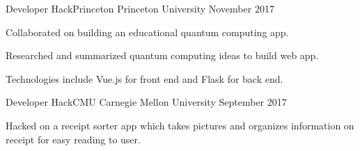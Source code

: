 \begin{cventries}
    \cventry
      {Developer}
      {HackPrinceton}
      {Princeton University}
      {November 2017}
      {
        \begin{cvitems}
            \item Collaborated on building an educational quantum computing app. 
            \item Researched and summarized quantum computing ideas to build web app.
            \item Technologies include Vue.js for front end and Flask for back end.
        \end{cvitems}
    }
    
    \cventry
      {Developer}
      {HackCMU}
      {Carnegie Mellon University}
      {September 2017}
      {
        \begin{cvitems}
            \item Hacked on a receipt sorter app which takes pictures and organizes information on receipt for easy reading to user.
        \end{cvitems}
    }
\end{cventries}
